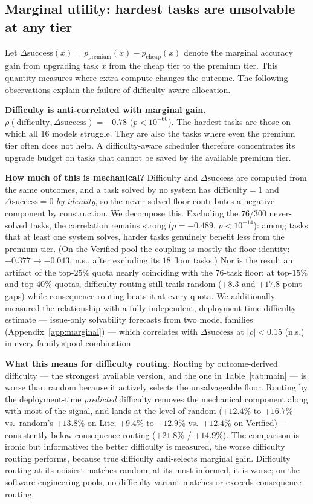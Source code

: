 \documentclass{article}
\begin{document}
\subsection{Marginal utility: hardest tasks are unsolvable at any tier}
\label{sec:marginal}

Let $\Delta\mathrm{success}(x) = p_{\mathrm{premium}}(x) -
p_{\mathrm{cheap}}(x)$ denote the marginal accuracy gain from upgrading
task $x$ from the cheap tier to the premium tier. This quantity
measures where extra compute changes the outcome. The following
observations explain the failure of difficulty-aware allocation.

\textbf{Difficulty is anti-correlated with marginal gain.}
\(\rho(\mathrm{difficulty}, \Delta\mathrm{success}) = -0.78\)
($p < 10^{-60}$). The hardest tasks are those on which all 16 models
struggle. They are also the tasks where even the premium tier often
does not help. A difficulty-aware scheduler therefore concentrates its
upgrade budget on tasks that cannot be saved by the available premium
tier.

\textbf{How much of this is mechanical?} Difficulty and
$\Delta\mathrm{success}$ are computed from the same outcomes, and a
task solved by no system has $\mathrm{difficulty} = 1$ and
$\Delta\mathrm{success} = 0$ \emph{by identity}, so the never-solved
floor contributes a negative component by construction. We decompose
this. Excluding the $76/300$ never-solved tasks, the correlation
remains strong ($\rho = -0.489$, $p < 10^{-14}$): among tasks that at
least one system solves, harder tasks genuinely benefit less from the
premium tier. (On the Verified pool the coupling is mostly the floor
identity: $-0.377 \to -0.043$, n.s., after excluding its $18$ floor
tasks.) Nor is the result an artifact of the top-$25\%$ quota nearly
coinciding with the $76$-task floor: at top-$15\%$ and top-$40\%$
quotas, difficulty routing still trails random ($+8.3$ and $+17.8$
point gaps) while consequence routing beats it at every quota. We
additionally measured the relationship with a fully
independent, deployment-time difficulty estimate --- issue-only
solvability forecasts from two model families
(Appendix~\ref{app:marginal}) --- which correlates with
$\Delta\mathrm{success}$ at $|\rho| < 0.15$ (n.s.) in every
family$\times$pool combination.

\textbf{What this means for difficulty routing.} Routing by
outcome-derived difficulty --- the strongest available version, and
the one in Table~\ref{tab:main} --- is worse than random because it
actively selects the unsalvageable floor. Routing by the
deployment-time \emph{predicted} difficulty removes the mechanical
component along with most of the signal, and lands at the level of
random ($+12.4\%$ to $+16.7\%$ vs.\ random's $+13.8\%$ on Lite;
$+9.4\%$ to $+12.9\%$ vs.\ $+12.4\%$ on Verified) --- consistently
below consequence routing ($+21.8\%$ / $+14.9\%$). The comparison is
ironic but informative: the better difficulty is measured, the worse
difficulty routing performs, because true difficulty anti-selects
marginal gain. Difficulty routing at its noisiest matches random; at
its most informed, it is worse; on the software-engineering pools,
no difficulty variant matches or exceeds consequence routing.
\end{document}
